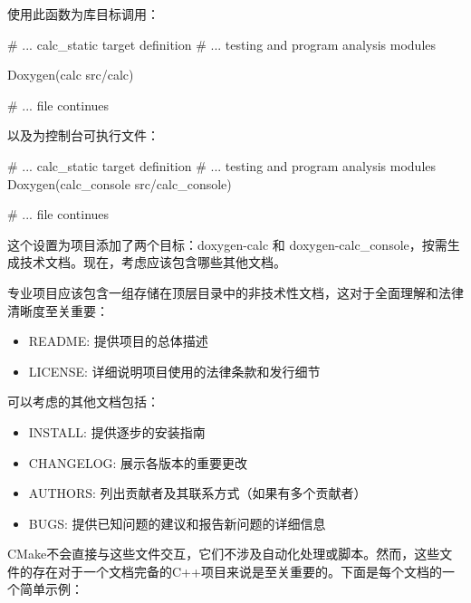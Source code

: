 使用此函数为库目标调用：


\begin{cmake}
# ... calc_static target definition
# ... testing and program analysis modules

Doxygen(calc src/calc)

# ... file continues
\end{cmake}

以及为控制台可执行文件：


\begin{cmake}
# ... calc_static target definition
# ... testing and program analysis modules
Doxygen(calc_console src/calc_console)

# ... file continues
\end{cmake}

这个设置为项目添加了两个目标：doxygen-calc 和 doxygen-calc\_console，按需生成技术文档。现在，考虑应该包含哪些其他文档。


专业项目应该包含一组存储在顶层目录中的非技术性文档，这对于全面理解和法律清晰度至关重要：

\begin{itemize}
\item
README: 提供项目的总体描述

\item
LICENSE: 详细说明项目使用的法律条款和发行细节
\end{itemize}

可以考虑的其他文档包括：

\begin{itemize}
\item
INSTALL: 提供逐步的安装指南

\item
CHANGELOG: 展示各版本的重要更改

\item
AUTHORS: 列出贡献者及其联系方式（如果有多个贡献者）

\item
BUGS: 提供已知问题的建议和报告新问题的详细信息
\end{itemize}

CMake不会直接与这些文件交互，它们不涉及自动化处理或脚本。然而，这些文件的存在对于一个文档完备的C++项目来说是至关重要的。下面是每个文档的一个简单示例：

